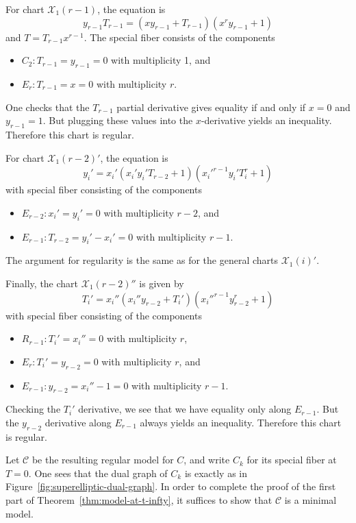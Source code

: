 \documentclass[reqno]{amsart}
\theoremstyle{definition}
\theoremstyle{remark}
\def\XX{\mathcal{X}}
\def\scd{\mathscr{C}}
\begin{document}
  For chart $\XX_1(r-1)$, the equation is
  \[
  y_{r-1} T_{r-1} = (x y_{r-1} + T_{r-1}) (x^{r} y_{r-1} + 1)
  \]
  and $T = T_{r-1} x^{r-1}$. The special fiber consists of the components
  \begin{itemize}
      \item $C_2: T_{r-1} = y_{r-1} = 0$ with multiplicity 1, and
      \item $E_r: T_{r-1} = x = 0$ with multiplicity $r$.
  \end{itemize}
  One checks that the $T_{r-1}$ partial derivative gives equality if and only if $x = 0$ and $y_{r-1} = 1$. But plugging these values into the $x$-derivative yields an inequality. Therefore this chart is regular.

  For chart $\XX_1(r-2)'$, the equation is
  \[
  y_i' = x_i' (x_i' y_i' T_{r-2} + 1) (x_i'^{r-1} y_i' T_i^{r} + 1)
  \]
  with special fiber consisting of the components
  \begin{itemize}
      \item $E_{r-2}: x_i' = y_i' = 0$ with multiplicity $r-2$, and
      \item $E_{r-1}: T_{r-2} = y_i' - x_i' = 0$ with multiplicity $r-1$.
  \end{itemize}
  The argument for regularity is the same as for the general charts $\XX_1(i)'$.

  Finally, the chart $\XX_1(r-2)''$ is given by
  \[
  T_i' = x_i'' (x_i'' y_{r-2} + T_i') (x_i''^{r-1} y_{r-2}^{r} + 1)
  \]
  with special fiber consisting of the components
  \begin{itemize}
      \item $R_{r-1}: T_i' = x_i'' = 0$ with multiplicity $r$,
      \item $E_r: T_i' = y_{r-2} = 0$ with multiplicity $r$, and
      \item $E_{r-1}: y_{r-2} = x_i'' - 1 = 0$ with multiplicity $r-1$.
  \end{itemize}
  Checking the $T_i'$ derivative, we see that we have equality only along $E_{r-1}$. But the $y_{r-2}$ derivative along $E_{r-1}$ always yields an inequality. Therefore this chart is regular.

  Let $\scd$ be the resulting regular model for $C$, and write $C_k$ for its special fiber at $T = 0$. One sees that the dual graph of $C_k$ is exactly as in Figure~\ref{fig:superelliptic-dual-graph}. In order to complete the proof of the first part of Theorem~\ref{thm:model-at-t-infty}, it suffices to show that $\scd$ is a minimal model.
\end{document}
